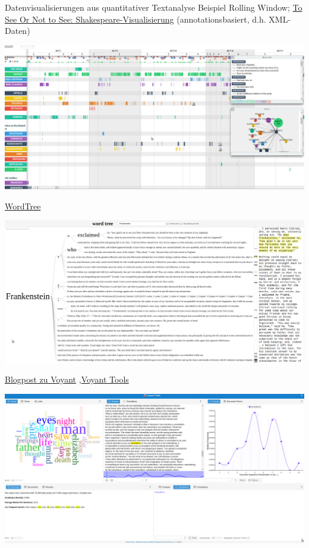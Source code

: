 \begin{frame}[allowframebreaks]{Datenvisualisierungen aus quantitativer Textanalyse}
Beispiel Rolling Window; 
\href{http://www.thomaswilhelm.eu/shakespeare/output/hamlet.html}{To See Or Not to See: Shakespeare-Visualisierung} (annotationsbasiert, d.h. XML-Daten)

\includegraphics[width=\textwidth]{img/toSeeOrNotToSee.png}

\framebreak

\href{https://www.jasondavies.com/wordtree/}{WordTree}

\includegraphics[width=\textwidth]{img/wordTree.png}

\framebreak

\href{https://blogs.reed.edu/ed-tech/2017/03/text-analysis-using-voyant-tools/}{Blogpost zu Voyant} \sep \href{https://voyant-tools.org/}{Voyant Tools}

\includegraphics[width=\textwidth]{img/voyant.png}
\end{frame}

